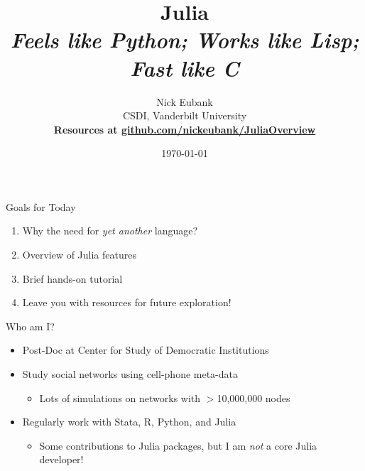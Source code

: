 \documentclass[11pt]{beamer}
\title{Julia \\ \emph{Feels like Python; Works like Lisp; Fast like C}}
\author{	\small Nick Eubank \\
			\scriptsize{CSDI, Vanderbilt University}\vspace*{.15in} \\
            {\normalsize \textbf{Resources at \url{github.com/nickeubank/JuliaOverview}}}}
\date{\vspace*{.3in} \today}
\begin{document}
\begin{frame}
	\maketitle
\end{frame}

\begin{frame}[c]{Goals for Today}
    \begin{enumerate}
        \item Why the need for \emph{yet another} language?
        \item Overview of Julia features
        \item Brief hands-on tutorial
        \item Leave you with resources for future exploration!
    \end{enumerate}
\end{frame}

\begin{frame}[c]{Who am I?}
\begin{itemize}
    \item Post-Doc at Center for Study of Democratic Institutions
    \item Study social networks using cell-phone meta-data
    \begin{itemize}
        \item Lots of simulations on networks with $>$10,000,000 nodes
    \end{itemize}
    \item Regularly work with Stata, R, Python, and Julia
    \begin{itemize}
        \item Some contributions to Julia packages, but I am \emph{not} a core Julia developer!
    \end{itemize}
\end{itemize}
\end{frame}
\end{document}
